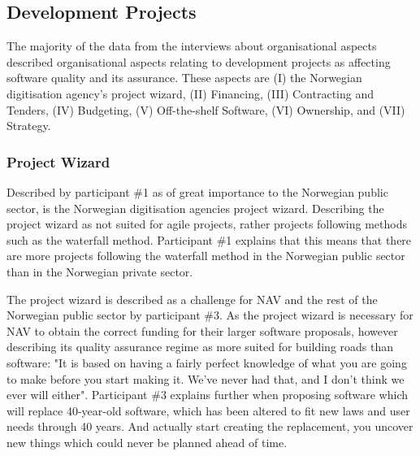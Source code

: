 
\subsection{Development Projects} \label{sec:development_projects}
The majority of the data from the interviews about organisational aspects described organisational aspects relating to development projects as affecting software quality and its assurance. These aspects are (I) the Norwegian digitisation agency's project wizard, (II) Financing, (III) Contracting and Tenders, (IV) Budgeting, (V) Off-the-shelf Software, (VI) Ownership, and (VII) Strategy.

\subsubsection{Project Wizard} \label{sec:project_wizard}
Described by participant \#1 as of great importance to the Norwegian public sector, is the Norwegian digitisation agencies project wizard. Describing the project wizard as not suited for agile projects, rather projects following methods such as the waterfall method. Participant \#1 explains that this means that there are more projects following the waterfall method in the Norwegian public sector than in the Norwegian private sector.


The project wizard is described as a challenge for NAV and the rest of the Norwegian public sector by participant \#3. As the project wizard is necessary for NAV to obtain the correct funding for their larger software proposals, however describing its quality assurance regime as more suited for building roads than software: "It is based on having a fairly perfect knowledge of what you are going to make before you start making it. We've never had that, and I don't think we ever will either". Participant \#3 explains further when proposing software which will replace 40-year-old software, which has been altered to fit new laws and user needs through 40 years. And actually start creating the replacement, you uncover new things which could never be planned ahead of time.

